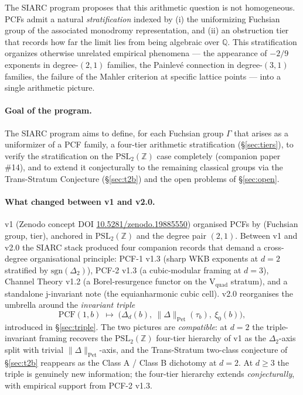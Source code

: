 \documentclass[11pt,a4paper]{article}
\theoremstyle{definition}
\theoremstyle{remark}
\newcommand{\PSLZ}{\mathrm{PSL}_2(\mathbb{Z})}
\newcommand{\PCF}{\mathrm{PCF}}
\newcommand{\Q}{\mathbb{Q}}
\newcommand{\PetN}[1]{\lVert #1 \rVert_{\mathrm{Pet}}}
\begin{document}
The SIARC program proposes that this arithmetic question is not
homogeneous. PCFs admit a natural \emph{stratification} indexed by
(i) the uniformizing Fuchsian group of the associated monodromy
representation, and (ii) an obstruction tier that records how far the
limit lies from being algebraic over $\Q$. This stratification organizes
otherwise unrelated empirical phenomena --- the appearance of $-2/9$
exponents in degree-$(2,1)$ families, the Painlevé connection in
degree-$(3,1)$ families, the failure of the Mahler criterion at
specific lattice points --- into a single arithmetic picture.

\paragraph{Goal of the program.}
The SIARC program aims to define, for each Fuchsian group $\Gamma$ that
arises as a uniformizer of a PCF family, a four-tier arithmetic
stratification (\S\ref{sec:tiers}), to verify the stratification on the
$\PSLZ$ case completely (companion paper \#14), and to extend it
conjecturally to the remaining classical groups via the Trans-Stratum
Conjecture (\S\ref{sec:t2b}) and the open problems of \S\ref{sec:open}.

\paragraph{What changed between v1 and v2.0.}
\label{par:v1-to-v2}
v1 (Zenodo concept DOI \href{https://doi.org/10.5281/zenodo.19885550}{10.5281/zenodo.19885550})
organised PCFs by (Fuchsian group, tier), anchored in $\PSLZ$ and the
degree pair $(2,1)$. Between v1 and v2.0 the SIARC stack produced four
companion records that demand a cross-degree organisational principle:
PCF-1 v1.3 (sharp WKB exponents at $d=2$ stratified by $\mathrm{sgn}(\Delta_2)$),
PCF-2 v1.3 (a cubic-modular framing at $d=3$),
Channel Theory v1.2 (a Borel-resurgence functor on the V$_{\mathrm{quad}}$
stratum), and a standalone j-invariant note (the equianharmonic cubic
cell). v2.0 reorganises the umbrella around the \emph{invariant triple}
\begin{equation}
  \label{eq:invariant-triple}
  \PCF(1,b) \;\longmapsto\; \bigl(\Delta_d(b),\ \PetN{\Delta}(\tau_b),\ \xi_0(b)\bigr),
\end{equation}
introduced in \S\ref{sec:triple}. The two pictures are
\emph{compatible}: at $d=2$ the triple-invariant framing recovers the
$\PSLZ$ four-tier hierarchy of v1 as the $\Delta_2$-axis split with
trivial $\PetN{\Delta}$-axis, and the Trans-Stratum two-class
conjecture of \S\ref{sec:t2b} reappears as the Class A / Class B
dichotomy at $d=2$. At $d \geq 3$ the triple is genuinely new
information; the four-tier hierarchy extends \emph{conjecturally},
with empirical support from PCF-2 v1.3.
\end{document}
